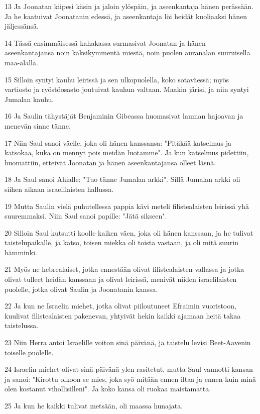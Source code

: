 \par 13 Ja Joonatan kiipesi käsin ja jaloin ylöspäin, ja aseenkantaja hänen perässään. Ja he kaatuivat Joonatanin edessä, ja aseenkantaja löi heidät kuoliaaksi hänen jäljessänsä.
\par 14 Tässä ensimmäisessä kahakassa surmasivat Joonatan ja hänen aseenkantajansa noin kaksikymmentä miestä, noin puolen auranalan suuruisella maa-alalla.
\par 15 Silloin syntyi kauhu leirissä ja sen ulkopuolella, koko sotaväessä; myös vartiosto ja ryöstöosasto joutuivat kauhun valtaan. Maakin järisi, ja niin syntyi Jumalan kauhu.
\par 16 Ja Saulin tähystäjät Benjaminin Gibeassa huomasivat lauman hajoavan ja menevän sinne tänne.
\par 17 Niin Saul sanoi väelle, joka oli hänen kanssansa: "Pitäkää katselmus ja katsokaa, kuka on mennyt pois meidän luotamme". Ja kun katselmus pidettiin, huomattiin, etteivät Joonatan ja hänen aseenkantajansa olleet läsnä.
\par 18 Ja Saul sanoi Ahialle: "Tuo tänne Jumalan arkki". Sillä Jumalan arkki oli siihen aikaan israelilaisten hallussa.
\par 19 Mutta Saulin vielä puhutellessa pappia kävi meteli filistealaisten leirissä yhä suuremmaksi. Niin Saul sanoi papille: "Jätä sikseen".
\par 20 Silloin Saul kutsutti koolle kaiken väen, joka oli hänen kanssaan, ja he tulivat taistelupaikalle, ja katso, toisen miekka oli toista vastaan, ja oli mitä suurin hämminki.
\par 21 Myös ne hebrealaiset, jotka ennestään olivat filistealaisten vallassa ja jotka olivat tulleet heidän kanssaan ja olivat leirissä, menivät niiden israelilaisten puolelle, jotka olivat Saulin ja Joonatanin kanssa.
\par 22 Ja kun ne Israelin miehet, jotka olivat piiloutuneet Efraimin vuoristoon, kuulivat filistealaisten pakenevan, yhtyivät hekin kaikki ajamaan heitä takaa taistelussa.
\par 23 Niin Herra antoi Israelille voiton sinä päivänä, ja taistelu levisi Beet-Aavenin toiselle puolelle.
\par 24 Israelin miehet olivat sinä päivänä ylen rasitetut, mutta Saul vannotti kansan ja sanoi: "Kirottu olkoon se mies, joka syö mitään ennen iltaa ja ennen kuin minä olen kostanut vihollisilleni". Ja koko kansa oli ruokaa maistamatta.
\par 25 Ja kun he kaikki tulivat metsään, oli maassa hunajata.
